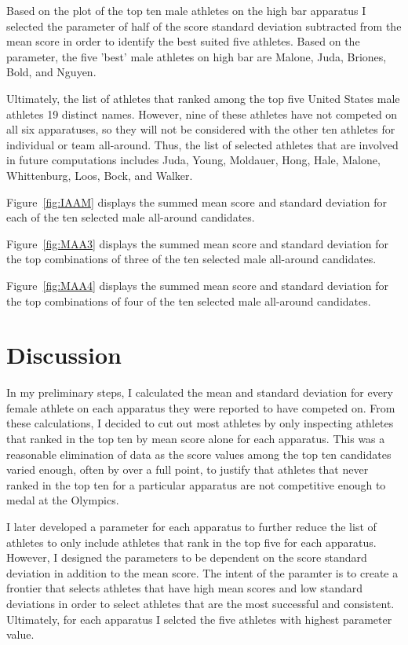 \documentclass[12pt]{article}
\begin{document}
  Based on the plot of the top ten male athletes on the high bar apparatus I selected the parameter of 
  half of the score standard deviation subtracted from the mean score in order to identify the best suited five 
  athletes. Based on the parameter, the five 'best' male athletes on high bar are Malone, Juda, Briones, Bold, and 
  Nguyen.

  Ultimately, the list of athletes that ranked among the top five United States male athletes 19 distinct 
  names. However, nine of these athletes have not competed on all six apparatuses, so they will not be considered 
  with the other ten athletes for individual or team all-around. Thus, the list of selected athletes that 
  are involved in future computations includes Juda, Young, Moldauer, Hong, Hale, Malone, Whittenburg, Loos, 
  Bock, and Walker.

  Figure~\ref{fig:IAAM} displays the summed mean score and standard deviation 
  for each of the ten selected male all-around candidates.


  Figure~\ref{fig:MAA3} displays the summed mean score and standard deviation 
  for the top combinations of three of the ten selected male all-around candidates.
  

  Figure~\ref{fig:MAA4} displays the summed mean score and standard deviation 
  for the top combinations of four of the ten selected male all-around candidates.

\section{Discussion}
\label{sec:dis}

In my preliminary steps, I calculated the mean and standard deviation for every female athlete on each 
apparatus they were reported to have competed on. From these calculations, I decided to cut out most athletes 
by only inspecting athletes that ranked in the top ten by mean score alone for each apparatus. This was a 
reasonable elimination of data as the score values among the top ten candidates varied enough, often by over a 
full point, to justify that athletes that never ranked in the top ten for a particular apparatus are not 
competitive enough to medal at the Olympics.

I later developed a parameter for each apparatus to further reduce the list of athletes to only include athletes 
that rank in the top five for each apparatus. However, I designed the parameters to be dependent on the score 
standard deviation in addition to the mean score. The intent of the paramter is to create a frontier that selects 
athletes that have high mean scores and low standard deviations in order to select athletes that are the most 
successful and consistent. Ultimately, for each apparatus I selcted the five athletes with highest parameter value.
\end{document}
